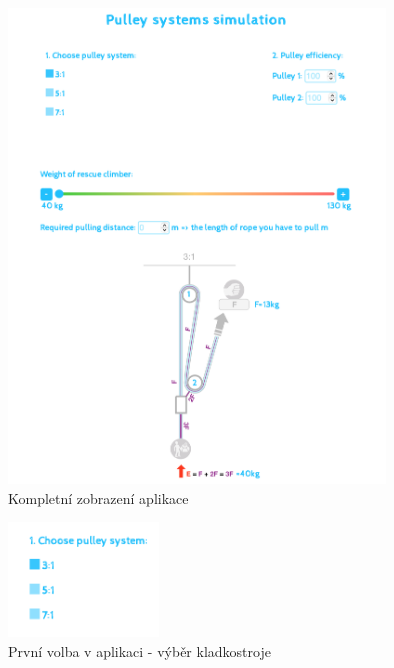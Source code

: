 \begin{figure}[!hbt]
    \centering
    \includegraphics[width=10.0cm]{Figures/WebApplication/1_Web_application.png}
    \caption[1_Aplikace]{Kompletní zobrazení aplikace}
    \label{Obr:1_application}
\end{figure} 

\begin{figure}[!hbt]
    \centering
    \includegraphics[width=4.0cm]{Figures/WebApplication/2_Web_application.png}
    \caption[2_Aplikace]{První volba v aplikaci - výběr kladkostroje}
    \label{Obr:2_application}
\end{figure} 

